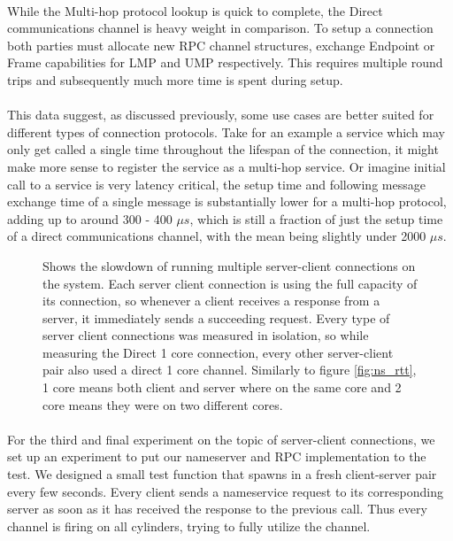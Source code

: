 \paragraph{}
While the Multi-hop protocol lookup is quick to complete, the Direct communications channel is heavy weight in comparison. To setup a connection both parties must allocate new RPC channel structures, exchange Endpoint or Frame capabilities for LMP and UMP respectively. This requires multiple round trips and subsequently much more time is spent during setup.
\paragraph{}
This data suggest, as discussed previously, some use cases are better suited for different types of connection protocols. Take for an example a service which may only get called a single time throughout the lifespan of the connection, it might make more sense to register the service as a multi-hop service. Or imagine initial call to a service is very latency critical, the setup time and following message exchange time of a single message is substantially lower for a multi-hop protocol, adding up to around 300 - 400 $\mu s$, which is still a fraction of just the setup time of a direct communications channel, with the mean being slightly under 2000 $\mu s$. 

\begin{figure}[h!]
    \centering
        \scalebox{0.5}{
            \hspace{-0.60in}
            
        }
    \caption{Shows the slowdown of running multiple server-client connections on the system. Each server client connection is using the full capacity of its connection, so whenever a client receives a response from a server, it immediately sends a succeeding request. Every type of server client connections was measured in isolation, so while measuring the Direct 1 core connection, every other server-client pair also used a direct 1 core channel. Similarly to figure \ref{fig:ns_rtt}, 1 core means both client and server where on the same core and 2 core means they were on two different cores.}
    \label{fig:client_serv_perf}
    
\end{figure}




\paragraph{}
For the third and final experiment on the topic of server-client connections, we set up an experiment to put our nameserver and RPC implementation to the test. We designed a small test function that spawns in a fresh client-server pair every few seconds. Every client sends a nameservice request to its corresponding server as soon as it has received the response to the previous call. Thus every channel is firing on all cylinders, trying to fully utilize the channel.

